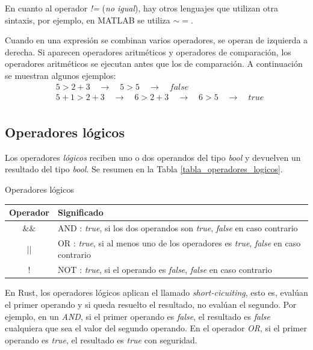 En cuanto al operador \textit{!=} (\textit{no igual}), hay otros lenguajes que utilizan otra sintaxis, por ejemplo, en MATLAB se utiliza $\sim =$.

Cuando en una expresión se combinan varios operadores, se operan de izquierda a derecha. Si aparecen operadores aritméticos y operadores de comparación, los operadores aritméticos se ejecutan antes que los de comparación. A continuación se muestran algunos ejemplos:
\begin{align*}
   & 5 > 2 + 3 \quad \rightarrow \quad 5 > 5 \quad \rightarrow \quad false\\
   & 5 + 1 > 2 + 3 \quad \rightarrow \quad 6 > 2 + 3 \quad \rightarrow \quad 6 > 5 \quad \rightarrow \quad true\\
\end{align*}


\subsection{Operadores lógicos}
Los operadores \textit{lógicos} reciben uno o dos operandos del tipo \textit{bool} y devuelven un resultado del tipo \textit{bool}. Se resumen en la Tabla \ref{tabla_operadores_logicos}.

\begin{center}
   \begin{mytable}[label=tabla_operadores_logicos]{\centering\footnotesize Operadores lógicos}
      \footnotesize
      \begin{tabular}{c l}
         \hline
         \textbf{Operador} & \textbf{Significado} \\ \hline
         $\&\&$ & AND : \textit{true}, si los dos operandos son \textit{true}, \textit{false} en caso contrario \\
         $||$ & OR : \textit{true}, si al menos uno de los operadores es \textit{true}, \textit{false} en caso contrario \\
         $!$ & NOT : \textit{true}, si el operando es \textit{false}, \textit{false} en caso contrario\\
      \end{tabular}
   \end{mytable}
\end{center}

En Rust, los operadores lógicos aplican el llamado \textit{short-cicuiting}, esto es, evalúan el primer operando y si queda resuelto el resultado, no evalúan el segundo. Por ejemplo, en un \textit{AND}, si el primer operando es \textit{false}, el resultado es \textit{false} cualquiera que sea el valor del segundo operando. En el operador \textit{OR}, si el primer operando es \textit{true}, el resultado es \textit{true} con seguridad.

